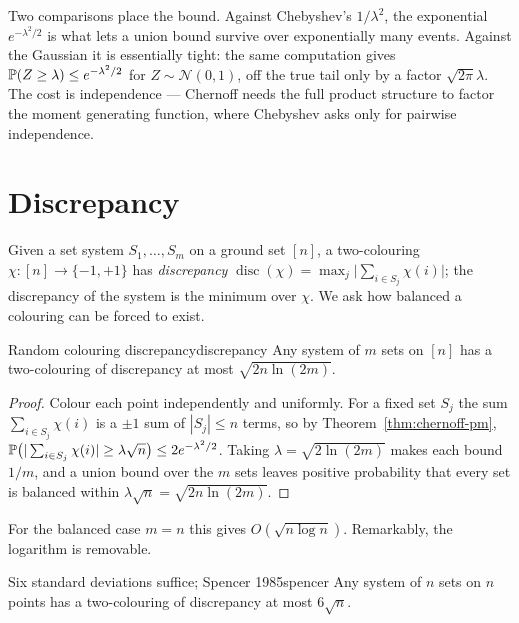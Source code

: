 \begin{insight}
Two comparisons place the bound. Against Chebyshev's $1/\lambda^2$, the
exponential $e^{-\lambda^2/2}$ is what lets a union bound survive over
exponentially many events. Against the Gaussian it is essentially tight: the
same computation gives $\mathbb{P}(Z\ge\lambda)\le e^{-\lambda^2/2}$ for
$Z\sim\mathcal N(0,1)$, off the true tail only by a factor $\sqrt{2\pi}\lambda$.
The cost is independence --- Chernoff needs the full product structure to factor
the moment generating function, where Chebyshev asks only for pairwise
independence.
\end{insight}

\section{Discrepancy}

Given a set system $S_1,\dots,S_m$ on a ground set $[n]$, a two-colouring
$\chi\colon[n]\to\{-1,+1\}$ has \emph{discrepancy}
$\operatorname{disc}(\chi)=\max_j\bigl|\sum_{i\in S_j}\chi(i)\bigr|$; the
discrepancy of the system is the minimum over $\chi$. We ask how balanced a
colouring can be forced to exist.

\begin{theorem}{Random colouring discrepancy}{discrepancy}
Any system of $m$ sets on $[n]$ has a two-colouring of discrepancy at most
$\sqrt{2n\ln(2m)}$.
\end{theorem}

\begin{proof}
Colour each point independently and uniformly. For a fixed set $S_j$ the sum
$\sum_{i\in S_j}\chi(i)$ is a $\pm1$ sum of $|S_j|\le n$ terms, so by
Theorem~\ref{thm:chernoff-pm},
$\mathbb{P}\bigl(|\sum_{i\in S_j}\chi(i)|\ge\lambda\sqrt n\bigr)\le2e^{-\lambda^2/2}$.
Taking $\lambda=\sqrt{2\ln(2m)}$ makes each bound $1/m$, and a union bound over
the $m$ sets leaves positive probability that every set is balanced within
$\lambda\sqrt n=\sqrt{2n\ln(2m)}$.
\end{proof}

For the balanced case $m=n$ this gives $O(\sqrt{n\log n})$. Remarkably, the
logarithm is removable.

\begin{theorem}{Six standard deviations suffice; Spencer 1985}{spencer}
Any system of $n$ sets on $n$ points has a two-colouring of discrepancy at most
$6\sqrt n$.
\end{theorem}

